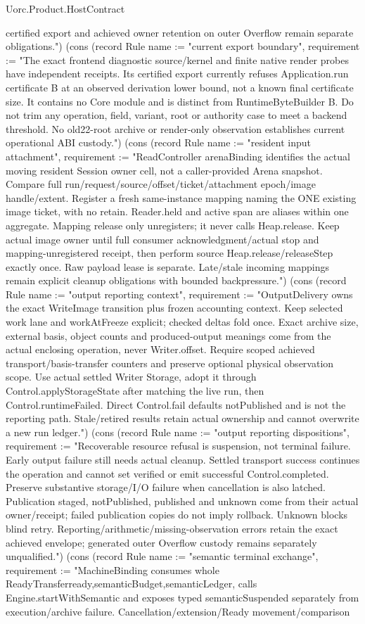 \begin{lexlean}{Uorc.Product.HostContract}
\begin{semanticmodule}
{certified export and achieved owner retention on outer Overflow remain separate obligations."}) (cons (record Rule {name := "current export boundary", requirement := "The exact frontend diagnostic source/kernel and finite native render probes have independent receipts. Its certified export currently refuses Application.run certificate B at an observed derivation lower bound, not a known final certificate size. It contains no Core module and is distinct from RuntimeByteBuilder B. Do not trim any operation, field, variant, root or authority case to meet a backend threshold. No old22-root archive or render-only observation establishes current operational ABI custody."}) (cons (record Rule {name := "resident input attachment", requirement := "ReadController arenaBinding identifies the actual moving resident Session owner cell, not a caller-provided Arena snapshot. Compare full run/request/source/offset/ticket/attachment epoch/image handle/extent. Register a fresh same-instance mapping naming the ONE existing image ticket, with no retain. Reader.held and active span are aliases within one aggregate. Mapping release only unregisters; it never calls Heap.release. Keep actual image owner until full consumer acknowledgment/actual stop and mapping-unregistered receipt, then perform source Heap.release/releaseStep exactly once. Raw payload lease is separate. Late/stale incoming mappings remain explicit cleanup obligations with bounded backpressure."}) (cons (record Rule {name := "output reporting context", requirement := "OutputDelivery owns the exact WriteImage transition plus frozen accounting context. Keep selected work lane and workAtFreeze explicit; checked deltas fold once. Exact archive size, external basis, object counts and produced-output meanings come from the actual enclosing operation, never Writer.offset. Require scoped achieved transport/basis-transfer counters and preserve optional physical observation scope. Use actual settled Writer Storage, adopt it through Control.applyStorageState after matching the live run, then Control.runtimeFailed. Direct Control.fail defaults notPublished and is not the reporting path. Stale/retired results retain actual ownership and cannot overwrite a new run ledger."}) (cons (record Rule {name := "output reporting dispositions", requirement := "Recoverable resource refusal is suspension, not terminal failure. Early output failure still needs actual cleanup. Settled transport success continues the operation and cannot set verified or emit successful Control.completed. Preserve substantive storage/I/O failure when cancellation is also latched. Publication staged, notPublished, published and unknown come from their actual owner/receipt; failed publication copies do not imply rollback. Unknown blocks blind retry. Reporting/arithmetic/missing-observation errors retain the exact achieved envelope; generated outer Overflow custody remains separately unqualified."}) (cons (record Rule {name := "semantic terminal exchange", requirement := "MachineBinding consumes whole ReadyTransfer{ready,semanticBudget,semanticLedger}, calls Engine.startWithSemantic and exposes typed semanticSuspended separately from execution/archive failure. Cancellation/extension/Ready movement/comparison }
\end{semanticmodule}
\end{lexlean}
